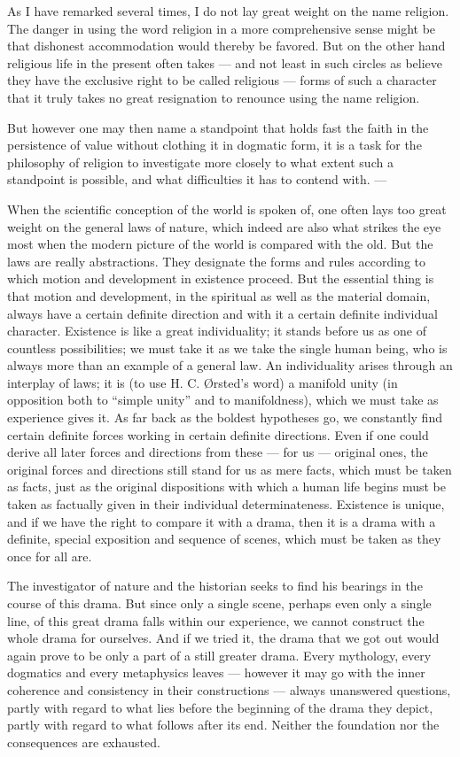 \documentclass[12pt,a4paper,openany]{book}
\newcommand{\opage}[1]{\marginnote{\footnotesize\textit{[#1]}}}
\begin{document}
As I have remarked several times, I do not lay great weight on the name religion. The
danger in using the word religion in a more comprehensive sense might be that dishonest
accommodation would thereby be favored. But on the other hand religious life in the
present often takes --- and not least in such circles as believe they have the exclusive
right to be called religious --- forms of such a character that it truly takes no great
resignation to renounce using the name religion.

But however one may then name a standpoint that holds fast the faith in the persistence
of value without clothing it in dogmatic form, it is a task for the philosophy of
religion to investigate more closely to what extent such a standpoint is possible, and
what difficulties it has to contend with. ---

When the scientific conception of the world is spoken of, one often lays too great weight
on the general laws of nature, which indeed are also what strikes the eye most when the
modern picture of the world is compared with the old. But the laws are really
abstractions. They designate the forms and rules according to which motion and
development in existence proceed. But the essential thing is that motion and development,
in the spiritual as well as the material domain, always have a certain definite direction
and with it a certain definite individual character. Existence is like a great
individuality; it stands before us as one of countless possibilities; we must take it as
we take the single human being, who is always more than an example of a general law. An
individuality arises through an interplay of laws; it is (to use H. C. Ørsted's word) a
manifold unity (in
\setcounter{footnote}{0}%
\opage{241}opposition both to ``simple unity'' and to manifoldness), which we must take as
experience gives it. As far back as the boldest hypotheses go, we constantly find certain
definite forces working in certain definite directions. Even if one could derive all
later forces and directions from these --- for us --- original ones, the original forces
and directions still stand for us as mere facts, which must be taken as facts, just as
the original dispositions with which a human life begins must be taken as factually given
in their individual determinateness. Existence is unique, and if we have the right to
compare it with a drama, then it is a drama with a definite, special exposition and
sequence of scenes, which must be taken as they once for all are.

The investigator of nature and the historian seeks to find his bearings in the course of
this drama. But since only a single scene, perhaps even only a single line, of this great
drama falls within our experience, we cannot construct the whole drama for ourselves.
And if we tried it, the drama that we got out would again prove to be only a part of a
still greater drama. Every mythology, every dogmatics and every metaphysics leaves ---
however it may go with the inner coherence and consistency in their constructions ---
always unanswered questions, partly with regard to what lies before the beginning of the
drama they depict, partly with regard to what follows after its end. Neither the
foundation nor the consequences are exhausted.
\end{document}
